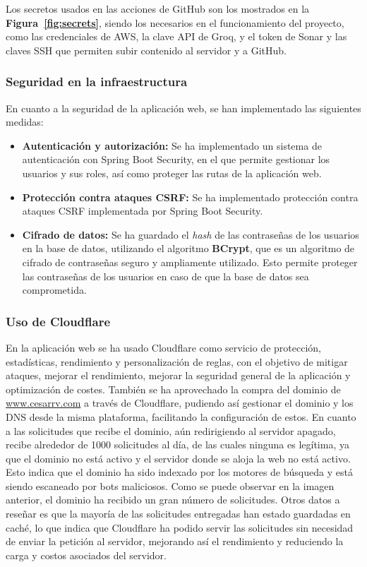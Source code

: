 Los secretos usados en las acciones de GitHub son los mostrados en la \textbf{Figura~\ref{fig:secrets}}, siendo los necesarios en el funcionamiento del proyecto, como las credenciales de AWS, la clave API de Groq, y el token de Sonar y las claves SSH que permiten subir contenido al servidor y a GitHub.

\subsubsection{Seguridad en la infraestructura}

En cuanto a la seguridad de la aplicación web, se han implementado las siguientes medidas:
\begin{itemize}
    \item \textbf{Autenticación y autorización:} Se ha implementado un sistema de autenticación con Spring Boot Security, en el que permite gestionar los usuarios y sus roles, así como proteger las rutas de la aplicación web.
    \item \textbf{Protección contra ataques CSRF:} Se ha implementado protección contra ataques CSRF implementada por Spring Boot Security.
    \item \textbf{Cifrado de datos:} Se ha guardado el \textit{hash} de las contraseñas de los usuarios en la base de datos, utilizando el algoritmo \textbf{BCrypt}, que es un algoritmo de cifrado de contraseñas seguro y ampliamente utilizado. Esto permite proteger las contraseñas de los usuarios en caso de que la base de datos sea comprometida.
\end{itemize}


\subsubsection{Uso de Cloudflare}
En la aplicación web se ha usado Cloudflare como servicio de protección, estadísticas, rendimiento y personalización de reglas, con el objetivo de mitigar ataques, mejorar el rendimiento, mejorar la seguridad general de la aplicación y optimización de costes.
También se ha aprovechado la compra del dominio de \url{www.cesarrv.com} a través de Cloudflare, pudiendo así gestionar el dominio y los DNS desde la misma plataforma, facilitando la configuración de estos.
En cuanto a las solicitudes que recibe el dominio, aún redirigiendo al servidor apagado, recibe alrededor de 1000 solicitudes al día, de las cuales ninguna es legítima, ya que el dominio no está activo y el servidor donde se aloja la web no está activo. Esto indica que el dominio ha sido indexado por los motores de búsqueda y está siendo escaneado por bots maliciosos.
Como se puede observar en la imagen anterior, el dominio ha recibido un gran número de solicitudes. Otros datos a reseñar es que la mayoría de las solicitudes entregadas han estado guardadas en caché, lo que indica que Cloudflare ha podido servir las solicitudes sin necesidad de enviar la petición al servidor, mejorando así el rendimiento y reduciendo la carga y costos asociados del servidor.

